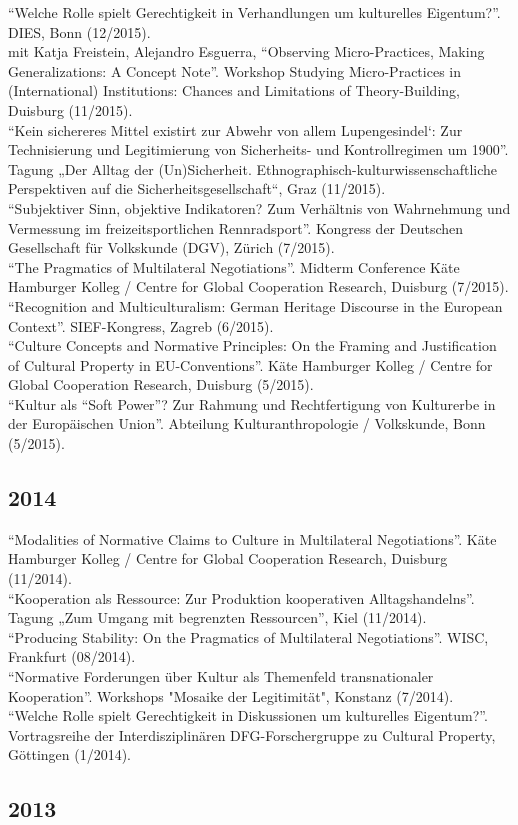 \enquote{Welche Rolle spielt Gerechtigkeit in Verhandlungen um kulturelles Eigentum?}. DIES, Bonn (12/2015).\\[.25cm]mit Katja Freistein, Alejandro Esguerra, \enquote{Observing Micro-Practices, Making Generalizations: A Concept Note}. Workshop Studying Micro-Practices in (International) Institutions: Chances and Limitations of Theory-Building, Duisburg (11/2015).\\[.25cm]\enquote{Kein sichereres Mittel existirt zur Abwehr von allem Lupengesindel‘: Zur Technisierung und Legitimierung von Sicherheits- und Kontrollregimen um 1900}. Tagung „Der Alltag der (Un)Sicherheit. Ethnographisch-kulturwissenschaftliche Perspektiven auf die Sicherheitsgesellschaft“, Graz (11/2015).\\[.25cm]\enquote{Subjektiver Sinn, objektive Indikatoren? Zum Verhältnis von Wahrnehmung und Vermessung im freizeitsportlichen Rennradsport}. Kongress der Deutschen Gesellschaft für Volkskunde (DGV), Zürich (7/2015).\\[.25cm]\enquote{The Pragmatics of Multilateral Negotiations}. Midterm Conference Käte Hamburger Kolleg / Centre for Global Cooperation Research, Duisburg (7/2015).\\[.25cm]\enquote{Recognition and Multiculturalism: German Heritage Discourse in the European Context}. SIEF-Kongress, Zagreb (6/2015).\\[.25cm]\enquote{Culture Concepts and Normative Principles: On the Framing and Justification of Cultural Property in EU-Conventions}. Käte Hamburger Kolleg / Centre for Global Cooperation Research, Duisburg (5/2015).\\[.25cm]\enquote{Kultur als “Soft Power”? Zur Rahmung und Rechtfertigung von Kulturerbe in der Europäischen Union}. Abteilung Kulturanthropologie / Volkskunde, Bonn (5/2015).\subsection*{2014}
\enquote{Modalities of Normative Claims to Culture in Multilateral Negotiations}. Käte Hamburger Kolleg / Centre for Global Cooperation Research, Duisburg (11/2014).\\[.25cm]\enquote{Kooperation als Ressource: Zur Produktion kooperativen Alltagshandelns}. Tagung „Zum Umgang mit begrenzten Ressourcen”, Kiel (11/2014).\\[.25cm]\enquote{Producing Stability: On the Pragmatics of Multilateral Negotiations}. WISC, Frankfurt (08/2014).\\[.25cm]\enquote{Normative Forderungen über Kultur als Themenfeld transnationaler Kooperation}. Workshops "Mosaike der Legitimität", Konstanz (7/2014).\\[.25cm]\enquote{Welche Rolle spielt Gerechtigkeit in Diskussionen um kulturelles Eigentum?}. Vortragsreihe der Interdisziplinären DFG-Forschergruppe zu Cultural Property, Göttingen (1/2014).\subsection*{2013}
